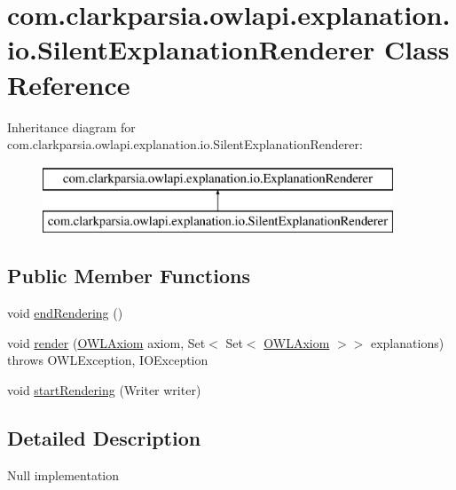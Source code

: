 \hypertarget{classcom_1_1clarkparsia_1_1owlapi_1_1explanation_1_1io_1_1_silent_explanation_renderer}{\section{com.\-clarkparsia.\-owlapi.\-explanation.\-io.\-Silent\-Explanation\-Renderer Class Reference}
\label{classcom_1_1clarkparsia_1_1owlapi_1_1explanation_1_1io_1_1_silent_explanation_renderer}
}
Inheritance diagram for com.\-clarkparsia.\-owlapi.\-explanation.\-io.\-Silent\-Explanation\-Renderer\-:\begin{figure}[H]
\begin{center}
\leavevmode
\includegraphics[height=2.000000cm]{classcom_1_1clarkparsia_1_1owlapi_1_1explanation_1_1io_1_1_silent_explanation_renderer}
\end{center}
\end{figure}
\subsection*{Public Member Functions}
\begin{DoxyCompactItemize}
\item 
void \hyperlink{classcom_1_1clarkparsia_1_1owlapi_1_1explanation_1_1io_1_1_silent_explanation_renderer_a454475d2662b97162501dd3532c822fe}{end\-Rendering} ()
\item 
void \hyperlink{classcom_1_1clarkparsia_1_1owlapi_1_1explanation_1_1io_1_1_silent_explanation_renderer_a9e4a15caf90052de61b5024ab132623a}{render} (\hyperlink{interfaceorg_1_1semanticweb_1_1owlapi_1_1model_1_1_o_w_l_axiom}{O\-W\-L\-Axiom} axiom, Set$<$ Set$<$ \hyperlink{interfaceorg_1_1semanticweb_1_1owlapi_1_1model_1_1_o_w_l_axiom}{O\-W\-L\-Axiom} $>$$>$ explanations)  throws O\-W\-L\-Exception, I\-O\-Exception 
\item 
void \hyperlink{classcom_1_1clarkparsia_1_1owlapi_1_1explanation_1_1io_1_1_silent_explanation_renderer_aab3fe16ae53cc92518930da05220f9f8}{start\-Rendering} (Writer writer)
\end{DoxyCompactItemize}


\subsection{Detailed Description}
Null implementation 

